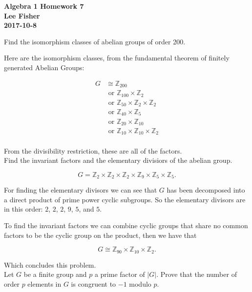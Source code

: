 \documentclass[12pt]{report}
\begin{document}
\textbf{Algebra 1 Homework 7}\\
\indent \textbf{Lee Fisher}\\
\indent \textbf{2017-10-8}

\vspace{0.3cm}

 Find the isomorphism classes of abelian groups of order
200.

Here are the isomorphism classes, from the fundamental theorem of finitely
generated Abelian Groups:

\begin{align*}
  G &\cong \mathbb{Z}_{200}\\
    &\textrm{ or } \mathbb{Z}_{100} \times \mathbb{Z}_2\\
    &\textrm{ or } \mathbb{Z}_{50} \times \mathbb{Z}_2 \times \mathbb{Z}_2\\
    &\textrm{ or } \mathbb{Z}_{40} \times \mathbb{Z}_5\\
    &\textrm{ or } \mathbb{Z}_{20} \times \mathbb{Z}_{10}\\
    &\textrm{ or } \mathbb{Z}_{10} \times \mathbb{Z}_{10} \times \mathbb{Z}_2\\
\end{align*}

From the divisibility restriction, these are all of the factors.\\

Find the invariant factors and the elementary divisiors of the abelian group.

$$G = \mathbb{Z}_2 \times \mathbb{Z}_2 \times\mathbb{Z}_2 \times\mathbb{Z}_9
\times \mathbb{Z}_5 \times\mathbb{Z}_5.$$

For finding the elementary divisors we can see that $G$ has been decomposed into
a direct product of prime power cyclic subgroups. So the elementary divisors are
in this order: $2$, $2$, $2$, $9$, $5$, and $5$.

To find the invariant factors we can combine cyclic groups that share no common
factors to be the cyclic group on the product, then we have that

$$G \cong \mathbb{Z}_{90} \times \mathbb{Z}_{10} \times \mathbb{Z}_2.$$

Which concludes this problem.\\

 Let $G$ be a finite group and $p$ a prime factor of
$|G|$. Prove that the number of order $p$ elements in $G$ is congruent to $-1$
modulo $p$.\\
\end{document}
